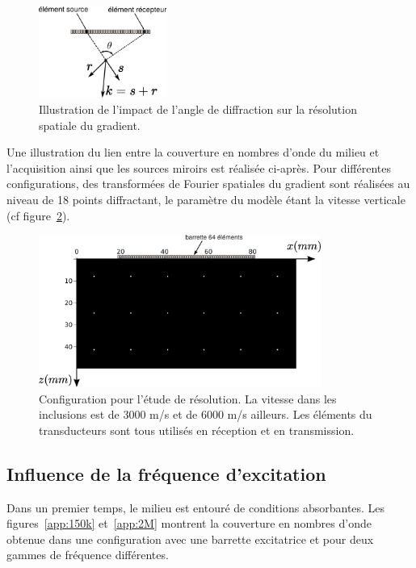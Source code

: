 \begin{figure}[!h]
	\centering
	\includegraphics[height=3cm]{img/reso.png}
	\caption{Illustration de l'impact de l'angle de diffraction sur la résolution spatiale du gradient.\label{app:k1}}
\end{figure}


Une illustration du lien entre la couverture en nombres d'onde du milieu et l'acquisition ainsi que les sources miroirs est réalisée ci-après. Pour différentes configurations, des transformées de Fourier spatiales du gradient sont réalisées au niveau de 18 points diffractant, le paramètre du modèle étant la vitesse verticale (cf figure~\ref{app:config_reso}).

\begin{figure}[!h]
	\centering
	\includegraphics[height=5cm]{img/vp_scat.png}
	\caption{Configuration pour l'étude de résolution. La vitesse dans les inclusions est de 3000 m/s et de 6000 m/s ailleurs. Les éléments du transducteurs sont tous utilisés en réception et en transmission. \label{app:config_reso}}
\end{figure}


\subsection{Influence de la fréquence d'excitation}

Dans un premier temps, le milieu est entouré de conditions absorbantes. Les figures~\ref{app:150k} et~\ref{app:2M} montrent la couverture en nombres d'onde obtenue dans une configuration avec une barrette excitatrice et pour deux gammes de fréquence différentes. 
    

